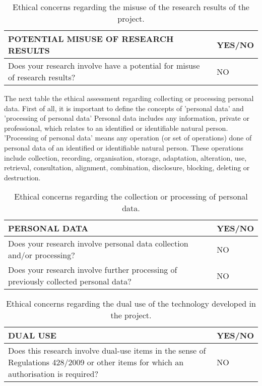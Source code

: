 \begin{table}[H]
	\centering
	\begin{tabular}[H]{>{\arraybackslash}p{10cm}
			>{\arraybackslash}p{3cm} }
		\toprule[2pt]
		
		\textbf{POTENTIAL MISUSE OF RESEARCH RESULTS} & \textbf{YES/NO} \\
		\midrule[1.5pt]
		Does your research involve have a potential for misuse of research results? & NO\\
		\bottomrule[2pt]		
	\end{tabular}
	\caption[Ethics - Misuse of results]{Ethical concerns regarding the misuse of the research results of the project.}
	\label{Ethics_Misuse}
\end{table}

The next table the ethical assessment regarding collecting or processing personal data. First of all, it is important to define the concepts of 'personal data' and 'processing of personal data' Personal data includes any information, private or professional, which relates to an identified or identifiable natural person. 'Processing of personal data' means any operation (or set of operations) done of personal data of an identified or identifiable natural person. These operations include collection, recording, organisation, storage, adaptation, alteration, use, retrieval, consultation, alignment, combination, disclosure, blocking, deleting or destruction.\\

\begin{table}[H]
	\centering
	\begin{tabular}[H]{>{\arraybackslash}p{10cm}
			>{\arraybackslash}p{3cm} }
		\toprule[2pt]
		
		\textbf{PERSONAL DATA} & \textbf{YES/NO} \\
		\midrule[1.5pt]
		Does your research involve personal data collection and/or processing? & NO\\
		Does your research involve further processing of previously collected personal data? & NO\\
	    \bottomrule[2pt]		
	\end{tabular}
	\caption[Ethics - Personal data]{Ethical concerns regarding the collection or processing of personal data.}
	\label{Ethics_personaldata}
\end{table}

\begin{table}[H]
	\centering
	\begin{tabular}[H]{>{\arraybackslash}p{10cm}
			>{\arraybackslash}p{3cm} }
		\toprule[2pt]
		
		\textbf{DUAL USE} & \textbf{YES/NO} \\
		\midrule[1.5pt]
		Does this research involve dual-use items in the sense of Regulations 428/2009 or other items for which an authorisation is required? & NO\\
		\bottomrule[2pt]		
	\end{tabular}
	\caption[Ethics - Dual use]{Ethical concerns regarding the dual use of the technology developed in the project.}
	\label{Ethics_Dualuse}
\end{table}


